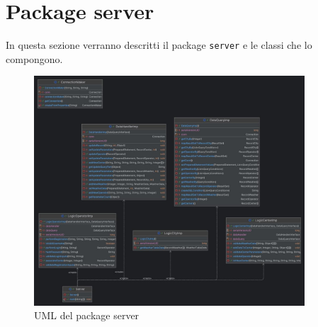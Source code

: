 \section{Package server}
In questa sezione verranno descritti il package \texttt{server} e le classi che lo compongono.\\

\begin{figure}[H]
    \centering
    \includegraphics[width=0.9\textwidth]{img/serverClassDiagram.jpg}
    \caption{UML del package server}
    \label{fig:Server}
\end{figure}

